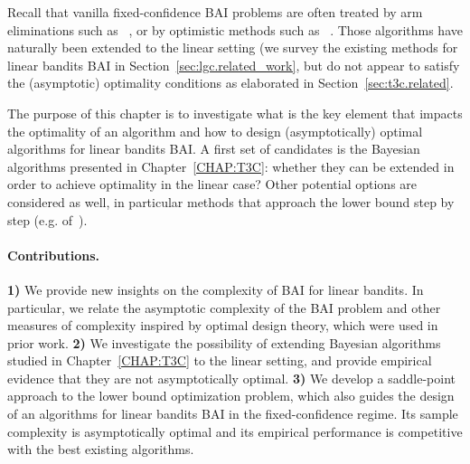 Recall that vanilla fixed-confidence BAI problems are often treated by arm eliminations such as \SE~\citep{karnin2013sha}, or by optimistic methods such as \UGapE~\citep{gabillon2012ugape}. Those algorithms have naturally been extended to the linear setting (we survey the existing methods for linear bandits BAI in Section~\ref{sec:lgc.related_work}, but do not appear to satisfy the (asymptotic) optimality conditions as elaborated in Section~\ref{sec:t3c.related}. 

The purpose of this chapter is to investigate what is the key element that impacts the optimality of an algorithm and how to design (asymptotically) optimal algorithms for linear bandits BAI. A first set of candidates is the Bayesian algorithms presented in Chapter~\ref{CHAP:T3C}: whether they can be extended in order to achieve optimality in the linear case? Other potential options are considered as well, in particular methods that approach the lower bound step by step (e.g. \Track of~\citealt{garivier2016tracknstop}).

\paragraph{Contributions.}
\textbf{1)}
We provide new insights on the complexity of BAI for linear bandits. In particular, we relate the asymptotic complexity of the BAI problem and other measures of complexity inspired by optimal design theory, which were used in prior work.
\textbf{2)}
We investigate the possibility of extending Bayesian algorithms studied in Chapter~\ref{CHAP:T3C} to the linear setting, and provide empirical evidence that they are not asymptotically optimal.
\textbf{3)}
We develop a saddle-point approach to the lower bound optimization problem, which also guides the design of an algorithms for linear bandits BAI in the fixed-confidence regime. Its sample complexity is asymptotically optimal and its empirical performance is competitive with the best existing algorithms.

%
%
%
